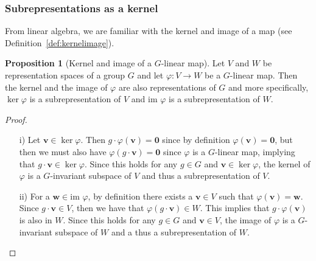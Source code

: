 \documentclass[12pt, a4paper, twoside]{article}
\theoremstyle{definition}
\newtheorem{proposition}[definition]{Proposition}
\theoremstyle{remark}
\numberwithin{equation}{section}
\newcommand{\1}{\mathbf{1}}
\newcommand{\0}{\mathbf{0}}
\newcommand{\im}{\text{im }}
\newcommand{\vvec}{\mathbf{v}}
\newcommand{\wvec}{\mathbf{w}}
\begin{document}
\subsubsection{Subrepresentations as a kernel}
	
	From linear algebra, we are familiar with the kernel and image of a map (see Definition~\ref{def:kernelimage}).
	
	\begin{proposition}[Kernel and image of a $G$-linear map]\label{prop:kernelimagelinearmap}
		Let $V$ and $W$ be representation spaces of a group $G$ and let $\varphi: V \rightarrow W$ be a $G$-linear map. Then the kernel and the image of $\varphi$ are also representations of $G$ and more specifically, $\ker \varphi$ is a subrepresentation of $V$ and $\im \varphi$ is a subrepresentation of $W$. 
	\end{proposition}
	\begin{proof}
		\begin{itemize}
			\item[i)] Let $\vvec \in \ker \varphi$. Then $g \cdot \varphi (\vvec) = \0$ since by definition $\varphi(\vvec) = \0$, but then we must also have $\varphi ( g \cdot \vvec ) = \0$ since $\varphi$ is a $G$-linear map, implying that $g \cdot \vvec \in \ker \varphi$. Since this holds for any $g \in G$ and $\vvec \in \ker \varphi$, the kernel of $\varphi$ is a $G$-invariant subspace of $V$ and thus a subrepresentation of $V$. %
			\item[ii)] For a $\wvec \in \im \varphi$, by definition there exists a $\vvec \in V$ such that $\varphi(\vvec) = \wvec$. Since $g \cdot \vvec \in V$, then we have that $\varphi ( g \cdot \vvec) \in W$. This implies that $g \cdot \varphi (\vvec)$ is also in $W$. Since this holds for any $g \in G$ and $\vvec \in V$, the image of $\varphi$ is a $G$-invariant subspace of $W$ and a thus a subrepresentation of $W$.	\qedhere
		\end{itemize}
	\end{proof}
	
\end{document}
